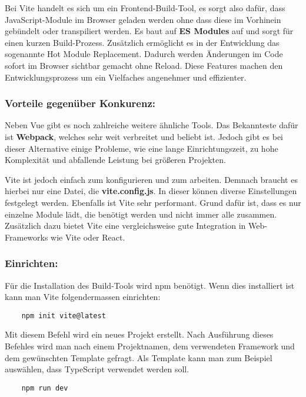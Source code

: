 Bei Vite handelt es sich um ein Frontend-Build-Tool, es sorgt also dafür, dass JavaScript-Module im Browser geladen werden ohne dass diese im Vorhinein gebündelt oder transpiliert werden. Es baut auf \textbf{ES Modules} auf und sorgt für einen kurzen Build-Prozess. Zusätzlich ermöglicht es in der Entwicklung das sogenannte Hot Module Replacement. Dadurch werden Änderungen im Code sofort im Browser sichtbar gemacht ohne Reload. Diese Features machen den Entwicklungsprozess um ein Vielfaches angenehmer und effizienter.

\subsubsection{Vorteile gegenüber Konkurenz:}
Neben Vue gibt es noch zahlreiche weitere ähnliche Tools. Das Bekannteste dafür ist \textbf{Webpack}, welches sehr weit verbreitet und beliebt ist. Jedoch gibt es bei dieser Alternative einige Probleme, wie eine lange Einrichtungszeit, zu hohe Komplexität und abfallende Leistung bei größeren Projekten.

Vite ist jedoch einfach zum konfigurieren und zum arbeiten. Demnach braucht es hierbei nur eine  Datei, die \textbf{vite.config.js}. In dieser können diverse Einstellungen festgelegt werden. Ebenfalls ist Vite sehr performant. Grund dafür ist, dass es nur einzelne Module lädt, die benötigt werden und nicht immer alle zusammen. Zusätzlich dazu bietet Vite eine vergleichsweise gute Integration in Web-Frameworks wie Vite oder React.

\subsubsection{Einrichten:}
Für die Installation des Build-Tools wird npm benötigt. Wenn dies installiert ist kann man Vite folgendermassen einrichten:

\begin{lstlisting}
    npm init vite@latest
\end{lstlisting}

Mit diesem Befehl wird ein neues Projekt erstellt. Nach Ausführung dieses Befehles wird man nach einem Projektnamen, dem verwendeten Framework und dem gewünschten Template gefragt. Als Template kann man zum Beispiel auswählen, dass TypeScript verwendet werden soll.

\begin{lstlisting}
    npm run dev
\end{lstlisting}

